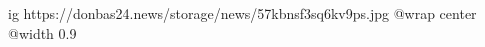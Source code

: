  
 
 
 
 

\ifcmt
  ig https://donbas24.news/storage/news/57kbnsf3sq6kv9ps.jpg
  @wrap center
  @width 0.9
\fi
